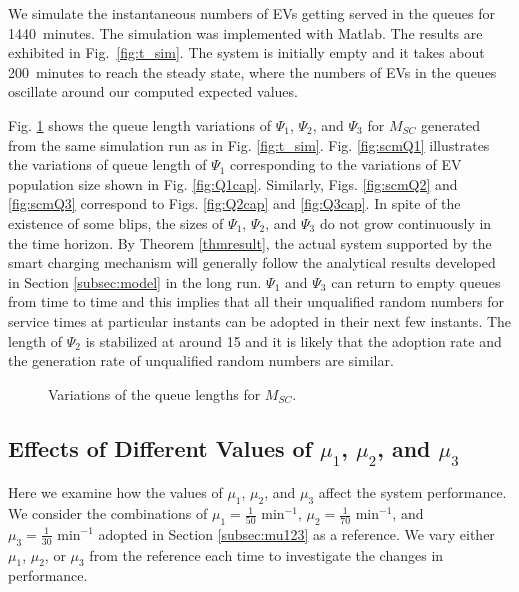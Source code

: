 \documentclass[journal]{IEEEtran}
\begin{document}
We simulate the instantaneous numbers of EVs getting served in the queues for
1440~minutes.  The simulation was implemented with Matlab.  The results
are exhibited in Fig.~\ref{fig:t_sim}.  The system is initially empty and it
takes about 200~minutes to reach the steady state, where the numbers of EVs in
the queues oscillate around our computed expected values.

Fig. \ref{fig:scm_queue} shows the queue length variations of $\Psi_1$, $\Psi_2$, and $\Psi_3$ for $M_{SC}$ generated from the same simulation run as in Fig. \ref{fig:t_sim}. Fig. \ref{fig:scmQ1} illustrates the variations of queue length of $\Psi_1$ corresponding to the variations of EV population size shown in Fig. \ref{fig:Q1cap}. Similarly, Figs. \ref{fig:scmQ2} and \ref{fig:scmQ3} correspond to Figs. \ref{fig:Q2cap} and \ref{fig:Q3cap}. In spite of the existence of some blips, the sizes of $\Psi_1$, $\Psi_2$, and $\Psi_3$ do not grow continuously in the time horizon. 
By Theorem \ref{thmresult}, the actual system supported by the smart charging mechanism will generally follow the analytical results developed in Section \ref{subsec:model} in the long run.
$\Psi_1$ and $\Psi_3$ can return to empty queues from time to time and this implies that all their unqualified random numbers for service times at particular instants can be adopted in their next few instants. The length of $\Psi_2$ is stabilized at around 15 and it is likely that the adoption rate and the generation rate of unqualified random numbers are similar.

\begin{figure}[!t]
	\begin{center}
	\end{center}
	\caption{Variations of the queue lengths for $M_{SC}$.}
  \label{fig:scm_queue}
\end{figure}

\subsection{Effects of Different Values of $\mu_1$, $\mu_2$, and $\mu_3$}
Here we examine how the values of $\mu_1$, $\mu_2$, and $\mu_3$ affect the system performance. We consider  the combinations of $\mu_1 = \frac{1}{50} \text{ min}^{-1}$, $\mu_2=\frac{1}{70} \text{ min}^{-1}$, and $\mu_3=\frac{1}{30} \text{ min}^{-1}$ adopted in Section \ref{subsec:mu123} as a reference. We vary either $\mu_1$, $\mu_2$, or $\mu_3$ from the reference each time to investigate the changes in performance.
\end{document}
